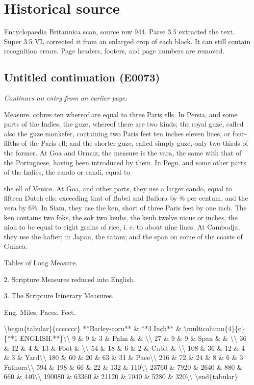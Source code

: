 \documentclass{article}
\begin{document}
\section*{Historical source}
Encyclopaedia Britannica scan, source row 944. Parse 3.5 extracted the text. Super 3.5 VL corrected it from an enlarged crop of each block. It can still contain recognition errors.
Page headers, footers, and page numbers are removed.

\subsection*{Untitled continuation (E0073)}
\textit{Continues an entry from an earlier page.}

Measure. cobres ten whereof are equal to three Paris ells. In Persia, and some parts of the Indies, the guze, whereof there are two kinds; the royal guze, called also the guze monkefer, containing two Paris feet ten inches eleven lines, or four-fifths of the Paris ell; and the shorter guze, called simply guze, only two thirds of the former. At Goa and Ormuz, the measure is the vara, the same with that of the Portuguese, having been introduced by them. In Pegu, and some other parts of the Indies, the cando or candi, equal to

the ell of Venice. At Goa, and other parts, they use a larger cando, equal to fifteen Dutch ells; exceeding that of Babel and Balfora by ⅜ per centum, and the vera by 6⅔. In Siam, they use the ken, short of three Paris feet by one inch. The ken contains two foks, the sok two keubs, the keub twelve nious or inches, the niou to be equal to eight grains of rice, i. e. to about nine lines. At Cambodja, they use the hafter; in Japan, the tatam; and the span on some of the coasts of Guinea.

Tables of Long Measure.

2. Scripture Measures reduced into English.

3. The Scripture Itinerary Measures.

Eng. Miles. Paces. Feet.

\textbackslash{}begin\{tabular\}\{ccccccc\}
**Barley-corn** \& **3 Inch** \& \textbackslash{}multicolumn\{4\}\{c\}\{**1 ENGLISH.**\}\textbackslash{}\textbackslash{}
9 \& 9 \& 3 \& Palm \& \& \textbackslash{}\textbackslash{}
27 \& 9 \& 9 \& Span \& \& \textbackslash{}\textbackslash{}
36 \& 12 \& 4 \& 13 \& Foot \& \textbackslash{}\textbackslash{}
54 \& 18 \& 6 \& 2 \& Cubit \& \textbackslash{}\textbackslash{}
108 \& 36 \& 12 \& 4 \& 3 \& Yard\textbackslash{}\textbackslash{}
180 \& 60 \& 20 \& 63 \& 31 \& Pace\textbackslash{}\textbackslash{}
216 \& 72 \& 24 \& 8 \& 6 \& 3 Fathora\textbackslash{}\textbackslash{}
594 \& 198 \& 66 \& 22 \& 132 \& 110\textbackslash{}\textbackslash{}
23760 \& 7920 \& 2640 \& 880 \& 660 \& 440\textbackslash{}\textbackslash{}
190080 \& 63360 \& 21120 \& 7040 \& 5280 \& 320\textbackslash{}\textbackslash{}
\textbackslash{}end\{tabular\}
\end{document}
